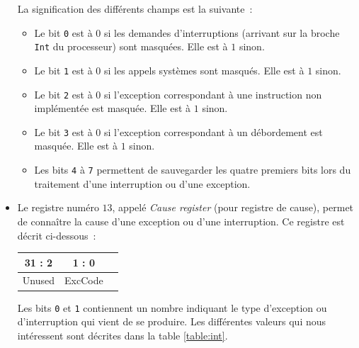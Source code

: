 \documentclass[12pt]{article}
\begin{document}
\begin{itemize}
La signification des différents champs est la suivante~:
\begin{itemize}
\item Le bit \verb+0+ est à $0$ si les demandes d'interruptions (arrivant sur la broche \verb+Int+ du processeur) sont masquées. Elle est à $1$
sinon.
\item Le bit \verb+1+ est à $0$ si les appels systèmes sont masqués. Elle est à $1$
sinon.
\item Le bit \verb+2+ est à $0$ si l'exception correspondant à une instruction non implémentée est masquée. Elle est à $1$
sinon.
\item Le bit \verb+3+ est à $0$ si l'exception correspondant à un débordement est masquée. Elle est à $1$
sinon.
\item Les bits \verb+4+ à \verb+7+ permettent de sauvegarder les quatre premiers bits lors du traitement d'une interruption ou d'une exception.\\
\end{itemize}



\item Le registre numéro $13$, appelé \emph{Cause register} (pour registre de cause), permet de connaître la cause d'une exception ou d'une interruption.
Ce registre est décrit ci-dessous~:\\

\begin{center}
\begin{tabular}{ccc}
 31 : 2 & 1 : 0\\
\hline
\multicolumn{1}{|c}{\hspace*{5cm}Unused\hspace*{5cm}} & \multicolumn{1}{|c|}{ExcCode}\\
\hline
\end{tabular}
\end{center}

\vspace{0.7cm}

Les bits \verb+0+ et \verb+1+ contiennent un nombre indiquant le type d'exception ou d'interruption qui vient de se produire. Les différentes valeurs
qui nous intéressent sont décrites dans la table \ref{table:int}.\\


\end{itemize}
\end{document}
